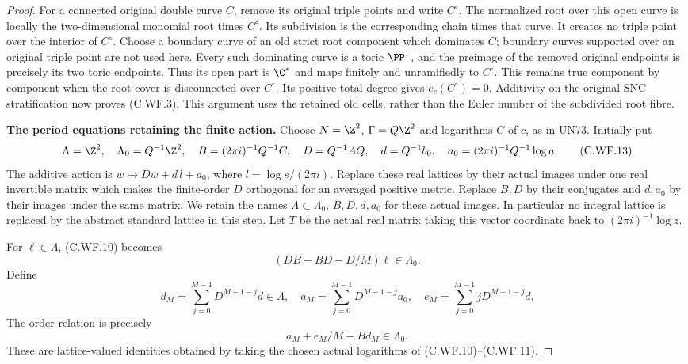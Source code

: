 \begin{proof}
For a connected original double curve \(C\), remove its
original triple points and write \(C^\circ\).  The normalized
root over this open curve is locally the two-dimensional
monomial root times \(C^\circ\).  Its subdivision is the
corresponding chain times that curve.  It creates no triple
point over the interior of \(C^\circ\).  Choose a boundary
curve of an old strict root component which dominates \(C\);
boundary curves supported over an original triple point
are not used here.  Every such dominating curve is a toric
\(\PP^1\), and the
preimage of the removed original endpoints is precisely
its two toric endpoints.  Thus its open part is \(\C^*\)
and maps finitely and unramifiedly to \(C^\circ\).
This remains true component by component when the root
cover is disconnected over \(C^\circ\).  Its positive total
degree gives \(e_c(C^\circ)=0\).  Additivity on the original
SNC stratification now proves (C.WF.3).  This argument
uses the retained old cells, rather than the Euler number
of the subdivided root fibre.

\par\medskip\noindent\textbf{The period equations retaining the finite action.}
Choose \(N=\Z^2\), \(\Gamma=Q\Z^2\) and logarithms \(C\)
of \(c\), as in UN73.  Initially put
\[
 \Lambda= \Z^2,\quad \Lambda_0=Q^{-1}\Z^2,\quad
 B=(2\pi i)^{-1}Q^{-1}C,\quad
 D=Q^{-1}AQ,\quad
 d=Q^{-1}b_0,\quad
 a_0=(2\pi i)^{-1}Q^{-1}\log a .
\tag{C.WF.13}
\]
The additive action is \(w\mapsto Dw+d\,l+a_0\),
where \(l=\log s/(2\pi i)\).  Replace these real lattices
by their actual images under one real invertible matrix
which makes the finite-order \(D\) orthogonal for an
averaged positive metric.  Replace \(B,D\) by their
conjugates and \(d,a_0\) by their images under the same
matrix.  We retain the names
\(\Lambda\subset\Lambda_0\), \(B,D,d,a_0\) for these
actual images.  In particular no integral lattice is
replaced by the abstract standard lattice in this step.
Let \(T\) be the actual real matrix taking this vector
coordinate back to \((2\pi i)^{-1}\log z\).

For \(\ell\in\Lambda\), (C.WF.10) becomes
\[
       (DB-BD-D/M)\ell\in\Lambda_0.
\tag{C.WF.14}
\]
Define
\[
 d_M=\sum_{j=0}^{M-1}D^{M-1-j}d\in\Lambda,\quad
 a_M=\sum_{j=0}^{M-1}D^{M-1-j}a_0,\quad
 e_M=\sum_{j=0}^{M-1}jD^{M-1-j}d .
\]
The order relation is precisely
\[
                   a_M+e_M/M-Bd_M\in\Lambda_0 .
\tag{C.WF.15}
\]
These are lattice-valued identities obtained by taking
the chosen actual logarithms of (C.WF.10)--(C.WF.11).


\end{proof}
